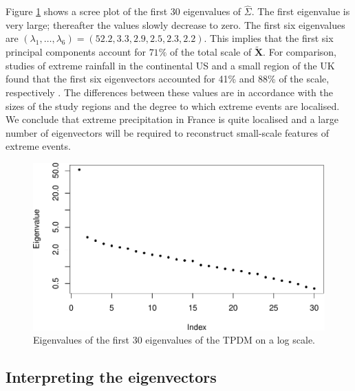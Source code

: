 \documentclass[en-GB, a4paper, nobind]{templates/bathreport}
\begin{document}
Figure \ref{fig:fr-tpdm-evals} shows a scree plot of the first 30 eigenvalues of \(\hat{\Sigma}\). The first eigenvalue is very large; thereafter the values slowly decrease to zero. The first six eigenvalues are \((\lambda_1,\ldots,\lambda_6)=(52.2, 3.3, 2.9, 2.5, 2.3, 2.2)\). This implies that the first six principal components account for \(71\%\) of the total scale of \(\tilde{\bm{X}}\). For comparison, studies of extreme rainfall in the continental US and a small region of the UK found that the first six eigenvectors accounted for 41\% and 88\% of the scale, respectively \autocite{jiangPrincipalComponentAnalysis2020,rohrbeckSimulatingFloodEvent2021}. The differences between these values are in accordance with the sizes of the study regions and the degree to which extreme events are localised. We conclude that extreme precipitation in France is quite localised and a large number of eigenvectors will be required to reconstruct small-scale features of extreme events.

\begin{figure}

{\centering \includegraphics[width=0.7\linewidth]{figures/fr-tpdm-evals-1} 

}

\caption[Eigenvalues of the TPDM.]{Eigenvalues of the first 30 eigenvalues of the TPDM on a log scale.}\label{fig:fr-tpdm-evals}
\end{figure}

\hypertarget{interpreting-the-eigenvectors}{%
\subsection{Interpreting the eigenvectors}\label{interpreting-the-eigenvectors}}
\end{document}
